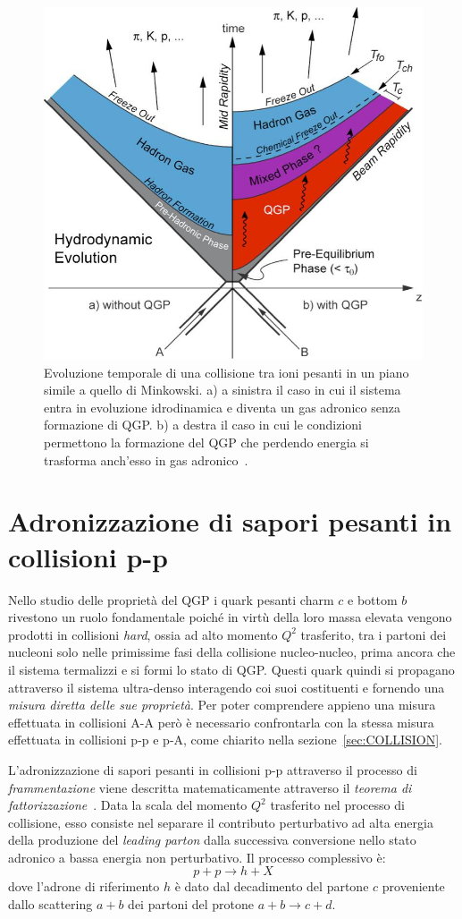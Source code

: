     \begin{figure}[h]
        \centering
        \includegraphics[width=0.65\linewidth]{res/fig/1-chapter/5-TimeEvolQGP.jpg}
        \caption{Evoluzione temporale di una collisione tra ioni pesanti in un piano simile a quello di Minkowski. a) a sinistra il caso in cui il sistema entra in evoluzione idrodinamica e diventa un gas adronico senza formazione di QGP. b) a destra il caso in cui le condizioni permettono la formazione del QGP che perdendo energia si trasforma anch'esso in gas adronico~\cite{ES_2011}.}
        \label{fig:5-time-evol-qgp}
    \end{figure}

\section{Adronizzazione di sapori pesanti in collisioni p-p}
\label{sec:ADRONIZATIONpp}
    Nello studio delle proprietà del QGP i quark pesanti charm $c$ e bottom $b$ rivestono un ruolo fondamentale poiché in virtù della loro massa elevata vengono prodotti in collisioni \textit{hard}, ossia ad alto momento $Q^2$ trasferito, tra i partoni dei nucleoni solo nelle primissime fasi della collisione nucleo-nucleo, prima ancora che il sistema termalizzi e si formi lo stato di QGP. Questi quark quindi si propagano attraverso il sistema ultra-denso interagendo coi suoi costituenti e fornendo una \textit{misura diretta delle sue proprietà}. Per poter comprendere appieno una misura effettuata in collisioni A-A però è necessario confrontarla con la stessa misura effettuata in collisioni p-p e p-A, come chiarito nella sezione~\ref{sec:COLLISION}.

    L'adronizzazione di sapori pesanti in collisioni p-p attraverso il processo di \textit{frammentazione} viene descritta matematicamente attraverso il \textit{teorema di fattorizzazione}~\cite{CSS_2004}. Data la scala del momento $Q^2$ trasferito nel processo di collisione, esso consiste nel separare il contributo perturbativo ad alta energia della produzione del \textit{leading parton} dalla successiva conversione nello stato adronico a bassa energia non perturbativo. Il processo complessivo è:
    \begin{equation*}
        p + p \to h + X
    \end{equation*}
    dove l'adrone di riferimento $h$ è dato dal decadimento del partone $c$ proveniente dallo scattering $a + b$ dei partoni del protone $a + b \to c + d$.

